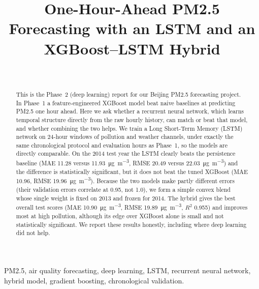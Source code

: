 \documentclass[onecolumn,11pt,journal]{IEEEtran}
\newcommand{\ugm}{\si{\micro\gram\per\cubic\metre}}
\begin{document}
\title{One-Hour-Ahead PM2.5 Forecasting with an LSTM and an XGBoost--LSTM Hybrid}

\author{%
\\[3pt]
}

\maketitle

\begin{abstract}
This is the Phase~2 (deep learning) report for our Beijing PM2.5 forecasting project. In Phase~1 a feature-engineered XGBoost model beat naive baselines at predicting PM2.5 one hour ahead. Here we ask whether a recurrent neural network, which learns temporal structure directly from the raw hourly history, can match or beat that model, and whether combining the two helps. We train a Long Short-Term Memory (LSTM) network on 24-hour windows of pollution and weather channels, under exactly the same chronological protocol and evaluation hours as Phase~1, so the models are directly comparable. On the 2014 test year the LSTM clearly beats the persistence baseline (MAE 11.28 versus 11.93~\ugm{}, RMSE 20.49 versus 22.03~\ugm{}) and the difference is statistically significant, but it does not beat the tuned XGBoost (MAE 10.96, RMSE 19.96~\ugm{}). Because the two models make partly different errors (their validation errors correlate at 0.95, not 1.0), we form a simple convex blend whose single weight is fixed on 2013 and frozen for 2014. The hybrid gives the best overall test scores (MAE 10.90~\ugm{}, RMSE 19.89~\ugm{}, $R^2$ 0.955) and improves most at high pollution, although its edge over XGBoost alone is small and not statistically significant. We report these results honestly, including where deep learning did not help.
\end{abstract}

\begin{IEEEkeywords}
PM2.5, air quality forecasting, deep learning, LSTM, recurrent neural network, hybrid model, gradient boosting, chronological validation.
\end{IEEEkeywords}

\end{document}
